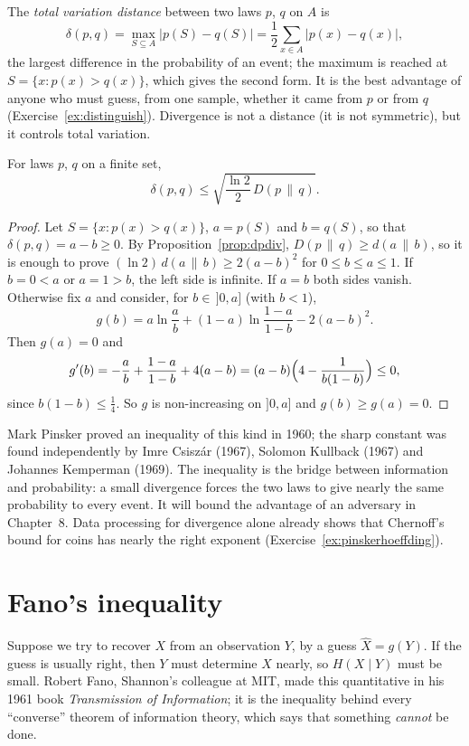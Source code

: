 The \emph{total variation distance} between two laws $p$, $q$ on $A$ is
\[
\delta(p,q)=\max_{S\subseteq A}\bigl|p(S)-q(S)\bigr|=\frac12\sum_{x\in A}\bigl|p(x)-q(x)\bigr|,
\]
the largest difference in the probability of an event; the maximum is reached at $S=\{x:p(x)>q(x)\}$, which gives the second form. It is the best advantage of anyone who must guess, from one sample, whether it came from $p$ or from $q$ (Exercise~\ref{ex:distinguish}). Divergence is not a distance (it is not symmetric), but it controls total variation.

\begin{theorem}\label{thm:pinsker}
For laws $p$, $q$ on a finite set,
\[
\delta(p,q)\le\sqrt{\frac{\ln2}2\,D(p\,\|\,q)}.
\]
\end{theorem}

\begin{proof}
Let $S=\{x:p(x)>q(x)\}$, $a=p(S)$ and $b=q(S)$, so that $\delta(p,q)=a-b\ge0$. By Proposition~\ref{prop:dpdiv}, $D(p\,\|\,q)\ge d(a\,\|\,b)$, so it is enough to prove $(\ln2)\,d(a\,\|\,b)\ge2(a-b)^2$ for $0\le b\le a\le1$. If $b=0<a$ or $a=1>b$, the left side is infinite. If $a=b$ both sides vanish. Otherwise fix $a$ and consider, for $b\in\,]0,a]$ (with $b<1$),
\[
g(b)=a\ln\frac ab+(1-a)\ln\frac{1-a}{1-b}-2(a-b)^2.
\]
Then $g(a)=0$ and
\[
g'(b)=-\frac ab+\frac{1-a}{1-b}+4(a-b)=(a-b)\Bigl(4-\frac1{b(1-b)}\Bigr)\le0,
\]
since $b(1-b)\le\frac14$. So $g$ is non-increasing on $]0,a]$ and $g(b)\ge g(a)=0$.
\end{proof}

Mark Pinsker proved an inequality of this kind in 1960; the sharp constant was found independently by Imre Csisz\'ar (1967), Solomon Kullback (1967) and Johannes Kemperman (1969). The inequality is the bridge between information and probability: a small divergence forces the two laws to give nearly the same probability to every event. It will bound the advantage of an adversary in Chapter~8. Data processing for divergence alone already shows that Chernoff's bound for coins has nearly the right exponent (Exercise~\ref{ex:pinskerhoeffding}).

\section{Fano's inequality}\label{sec:fano}

Suppose we try to recover $X$ from an observation $Y$, by a guess $\hat X=g(Y)$. If the guess is usually right, then $Y$ must determine $X$ nearly, so $H(X\mid Y)$ must be small. Robert Fano, Shannon's colleague at MIT, made this quantitative in his 1961 book \emph{Transmission of Information}; it is the inequality behind every ``converse'' theorem of information theory, which says that something \emph{cannot} be done.

